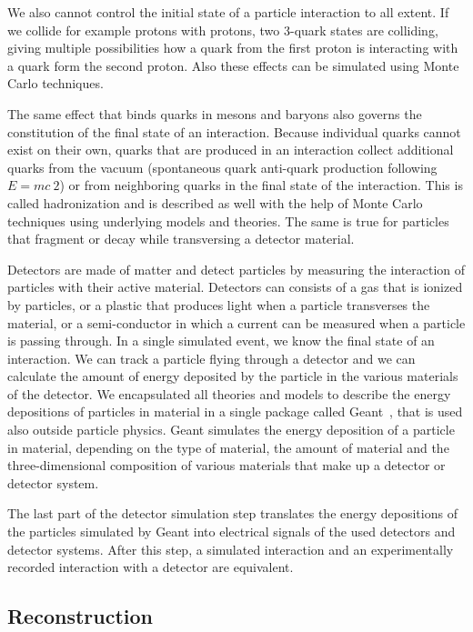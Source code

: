 \documentclass{wscpaperproc}
\theoremstyle{wsc}
\begin{document}
We also cannot control the initial state of a particle interaction to all extent. If we collide for example protons with protons, two 3-quark states are colliding, giving multiple possibilities how a quark from the first proton is interacting with a quark form the second proton. Also these effects can be simulated using Monte Carlo techniques.

The same effect that binds quarks in mesons and baryons also governs the constitution of the final state of an interaction. Because individual quarks cannot exist on their own, quarks that are produced in an interaction collect additional quarks from the vacuum (spontaneous quark anti-quark production following $E=mc~2$) or from neighboring quarks in the final state of the interaction. This is called hadronization and is described as well with the help of Monte Carlo techniques using underlying models and theories. The same is true for particles that fragment or decay while transversing a detector material.

Detectors are made of matter and detect particles by measuring the interaction of particles with their active material. Detectors can consists of a gas that is ionized by particles, or a plastic that produces light when a particle transverses the material, or a semi-conductor in which a current can be measured when a particle is passing through. In a single simulated event, we know the final state of an interaction. We can track a particle flying through a detector and we can calculate the amount of energy deposited by the particle in the various materials of the detector. We encapsulated all theories and models to describe the energy depositions of particles in material in a single package called Geant~, that is used also outside particle physics. Geant simulates the energy deposition of a particle in material, depending on the type of material, the amount of material and the three-dimensional composition of various materials that make up a detector or detector system. 

The last part of the detector simulation step translates the energy depositions of the particles simulated by Geant into electrical signals of the used detectors and detector systems. After this step, a simulated interaction and an experimentally recorded interaction with a detector are equivalent.

\subsection{Reconstruction}
\label{subsec:reconstruction}
\end{document}
